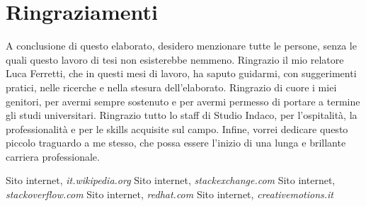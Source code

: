 \documentclass[12pt,a4paper]{article}
\begin{document}
\clearpage

\section*{Ringraziamenti}
A conclusione di questo elaborato, desidero menzionare tutte le persone, senza le quali questo lavoro di tesi non esisterebbe nemmeno.
Ringrazio il mio relatore Luca Ferretti, che in questi mesi di lavoro, ha saputo guidarmi, con suggerimenti pratici, nelle ricerche e nella stesura dell’elaborato.
Ringrazio di cuore i miei genitori, per avermi sempre sostenuto e per avermi permesso di portare a termine gli studi universitari.
Ringrazio tutto lo staff di Studio Indaco, per l’ospitalità, la professionalità e per le skills acquisite sul campo.
Infine, vorrei dedicare questo piccolo traguardo a me stesso, che possa essere l’inizio di una lunga e brillante carriera professionale.

\clearpage

\begin{thebibliography}{9}
        \bibitem{}
            Sito internet,
            \textit{it.wikipedia.org}
        \bibitem{}
            Sito internet,
            \textit{stackexchange.com}
        \bibitem{}
            Sito internet,
            \textit{stackoverflow.com}
        \bibitem{}
            Sito internet,
            \textit{redhat.com}
        \bibitem{}
            Sito internet,
            \textit{creativemotions.it}
    \end{thebibliography}
\end{document}

